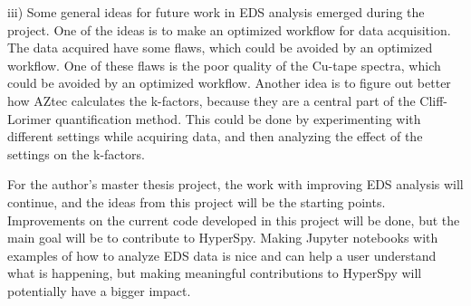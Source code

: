 iii) Some general ideas for future work in EDS analysis emerged during the project.
One of the ideas is to make an optimized workflow for data acquisition.
The data acquired have some flaws, which could be avoided by an optimized workflow.
One of these flaws is the poor quality of the Cu-tape spectra, which could be avoided by an optimized workflow.
Another idea is to figure out better how AZtec calculates the k-factors, because they are a central part of the Cliff-Lorimer quantification method.
This could be done by experimenting with different settings while acquiring data, and then analyzing the effect of the settings on the k-factors.














For the author's master thesis project, the work with improving EDS analysis will continue, and the ideas from this project will be the starting points.
Improvements on the current code developed in this project will be done, but the main goal will be to contribute to HyperSpy.
Making Jupyter notebooks with examples of how to analyze EDS data is nice and can help a user understand what is happening, but making meaningful contributions to HyperSpy will potentially have a bigger impact.




